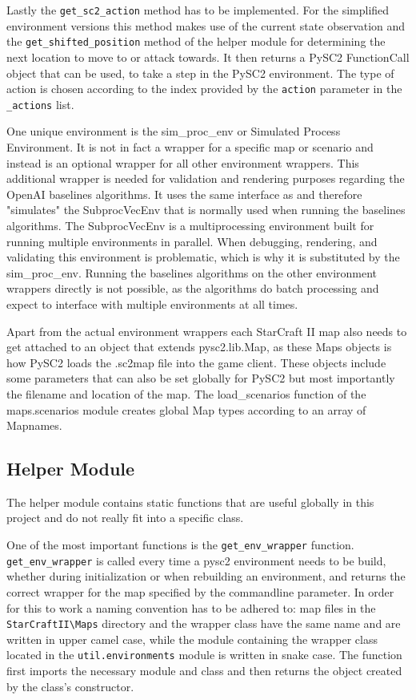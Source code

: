 Lastly the \lstinline{get_sc2_action} method has to be implemented.
For the simplified environment versions this method makes use of the current state observation and the \lstinline{get_shifted_position} method of the helper module for determining the next location to move to or attack towards. It then returns a PySC2 FunctionCall object that can be used, to take a step in the PySC2 environment. The type of action is chosen according to the index provided by the \lstinline{action} parameter in the \lstinline{_actions} list.

One unique environment is the sim\_proc\_env or Simulated Process Environment. It is not in fact a wrapper for a specific map or scenario and instead is an optional wrapper for all other environment wrappers. This additional wrapper is needed for validation and rendering purposes regarding the OpenAI baselines algorithms. It uses the same interface as and therefore "simulates" the SubprocVecEnv that is normally used when running the baselines algorithms. The SubprocVecEnv is a multiprocessing environment built for running multiple environments in parallel. When debugging, rendering, and validating this environment is problematic, which is why it is substituted by the sim\_proc\_env. Running the baselines algorithms on the other environment wrappers directly is not possible, as the algorithms do batch processing and expect to interface with multiple environments at all times.

Apart from the actual environment wrappers each StarCraft II map also needs to get attached to an object that extends pysc2.lib.Map, as these Maps objects is how PySC2 loads the .sc2map file into the game client. These objects include some parameters that can also be set globally for PySC2 but most importantly the filename and location of the map. The load\_scenarios function of the maps.scenarios module creates global Map types according to an array of Mapnames.

\subsection{Helper Module}
The helper module contains static functions that are useful globally in this project and do not really fit into a specific class.

One of the most important functions is the \lstinline{get_env_wrapper} function. \lstinline{get_env_wrapper} is called every time a pysc2 environment needs to be build, whether during initialization or when rebuilding an environment, and returns the correct wrapper for the map specified by the commandline parameter.
In order for this to work a naming convention has to be adhered to: map files in the \lstinline{StarCraftII\Maps} directory and the wrapper class have the same name and are written in upper camel case, while the module containing the wrapper class located in the \lstinline{util.environments} module is written in snake case. The function first imports the necessary module and class and then returns the object created by the class's constructor.

